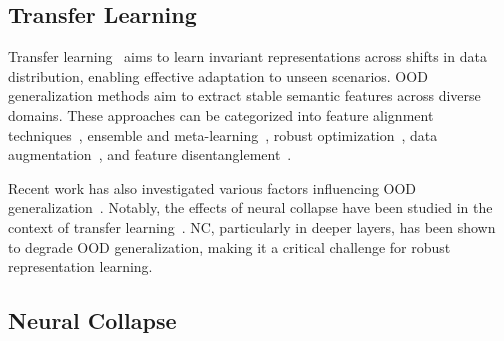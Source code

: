 

\subsection{Transfer Learning}

Transfer learning~\cite{liu2021towards} aims to learn invariant representations across shifts in data distribution, enabling effective adaptation to unseen scenarios. %
OOD generalization methods aim to extract stable semantic features across diverse domains. These approaches can be categorized into feature alignment techniques~\cite{li2018domain, ahuja2021invariance, zhao2020domain, ming2024hypo}, ensemble and meta-learning~\cite{balaji2018metareg, li2018metalearning, li2019episodic, bui2021exploiting}, robust optimization~\cite{rame2022fishr, cha2021swad, krueger2021out, shi2021gradient}, data augmentation~\cite{nam2021reducing, nuriel2021permuted, zhou2020learning}, and feature disentanglement~\cite{zhang2022towards}.

Recent work has also investigated various factors influencing OOD generalization~\cite{masarczyk2023tunnel, kornblith2021better, fang2024does, ramanujan2024connection, kolesnikov2020big, vishniakov2024convnet}. 
Notably, the effects of neural collapse have been studied in the context of transfer learning~\cite{kothapallineural, masarczyk2023tunnel, harun2024what}. NC, particularly in deeper layers, has been shown to degrade OOD generalization, making it a critical challenge for robust representation learning.


\subsection{Neural Collapse}

